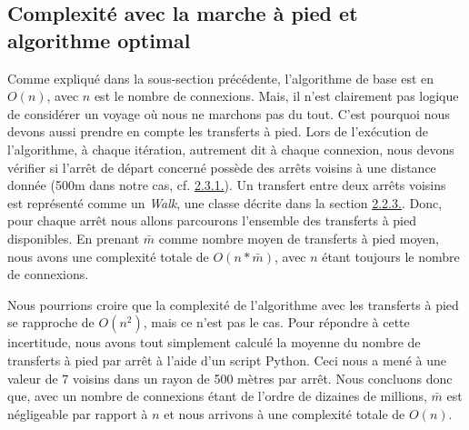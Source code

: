 \documentclass[12pt]{article}
\begin{document}
\subsection{Complexité avec la marche à pied et algorithme optimal}
Comme expliqué dans la sous-section précédente, l'algorithme de base est en $O(n)$, avec $n$ est le nombre de connexions. Mais, il n'est clairement pas logique
de considérer un voyage où nous ne marchons pas du tout. C'est pourquoi nous devons aussi prendre en compte les transferts à pied. Lors de l'exécution de
l'algorithme, à chaque itération, autrement dit à chaque connexion, nous devons vérifier si l'arrêt de départ concerné possède des arrêts voisins à une distance
donnée (500m dans notre cas, cf. \hyperref[sec:complexitetempinit]{2.3.1.}). Un transfert entre deux arrêts voisins est représenté comme un \emph{Walk}, une
classe décrite dans la section \hyperref[sec:walk]{2.2.3.}. Donc, pour chaque arrêt nous allons parcourons l'ensemble des transferts à pied disponibles.
En prenant $\bar{m}$ comme nombre moyen de transferts à pied moyen, nous avons une complexité totale de $O(n * \bar{m})$, avec $n$ étant toujours le nombre de connexions.

Nous pourrions croire que la complexité de l'algorithme avec les transferts à pied se rapproche de $O(n^2)$, mais ce n'est pas le cas. Pour répondre à cette incertitude,
nous avons tout simplement calculé la moyenne du nombre de transferts à pied par arrêt à l'aide d'un script Python. Ceci nous a mené à une valeur de 7 voisins dans un
rayon de 500 mètres par arrêt. Nous concluons donc que, avec un nombre de connexions étant de l'ordre de dizaines de millions, $\bar{m}$ est négligeable par rapport à $n$ et
nous arrivons à une complexité totale de $O(n)$.
\end{document}
